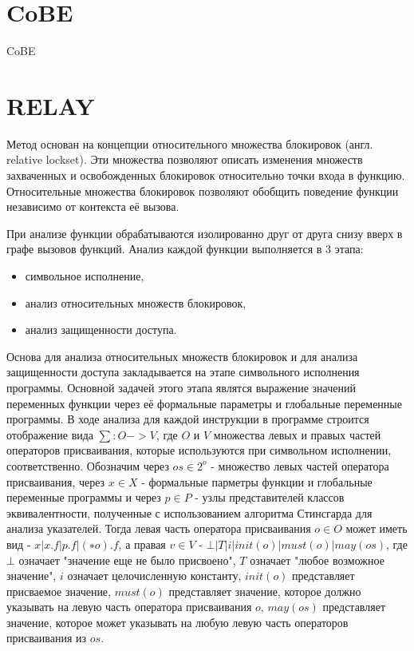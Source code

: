 \section{CoBE}
CoBE

\section{RELAY}

Метод основан на концепции относительного множества блокировок (англ. relative lockset). Эти множества позволяют описать изменения множеств захваченных и освобожденных блокировок относительно точки входа в функцию. Относительные множества блокировок позволяют обобщить поведение функции независимо от контекста её вызова.

При анализе функции обрабатываются изолированно друг от друга снизу вверх в графе вызовов функций. Анализ каждой функции выполняется в 3 этапа:
\begin{itemize}
\item символьное исполнение,
\item анализ относительных множеств блокировок,
\item анализ защищенности доступа.
\end{itemize}

Основа для анализа относительных множеств блокировок и для анализа защищенности доступа закладывается на этапе символьного исполнения программы. Основной задачей этого этапа являтся выражение значений переменных функции через её формальные параметры и глобальные переменные программы. В ходе анализа для каждой инструкции в программе строится отображение вида $\sum: O->V$, где $O$ и $V$ множества левых и правых частей операторов присваивания, которые используются при символьном исполнении, соответственно. Обозначим через $os \in 2^{o}$ - множество левых частей оператора присваивания, через $x \in X$ - формальные парметры функции и глобальные переменные программы и через $p \in P$ - узлы представителей классов эквивалентности, полученные с использованием алгоритма Стинсгарда для анализа указателей. Тогда левая часть оператора присваивания $o \in O$ может иметь вид - $x | x.f | p.f | (∗o).f$, а правая $v \in V$ - $⊥ | T | i | init(o) | must(o) | may(os)$, где $⊥$ означает "значение еще не было присвоено", $T$ означает "любое возможное значение", $i$ означает целочисленную константу, $init(o)$ представляет присваемое значение, $must(o)$ представляет значение, которое должно указывать на левую часть оператора присваивания $o$, $may(os)$ представляет значение, которое может указывать на любую левую часть операторов присваивания из $os$.

